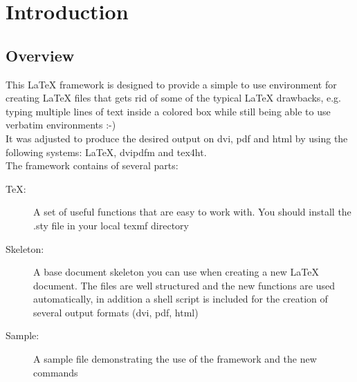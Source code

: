 \section{Introduction}


\subsection{Overview}
This LaTeX framework is designed to provide a simple to use environment for creating LaTeX files
that gets rid of some of the typical LaTeX drawbacks, e.g. typing multiple lines of text inside
a colored box while still being able to use verbatim environments :-)\\
It was adjusted to produce the desired output on dvi, pdf and html by using the following
systems: LaTeX, dvipdfm and tex4ht.
\\

\noindent
The framework contains of several parts:
\begin{description}
\item[TeX:]
A set of useful functions that are easy to work with. You should install the .sty file
in your local texmf directory
\item[Skeleton:]
A base document skeleton you can use when creating a new LaTeX document. The files are
well structured and the new functions are used automatically, in addition a shell
script is included for the creation of several output formats (dvi, pdf, html)
\item[Sample:]
A sample file demonstrating the use of the framework and the new commands
\end{description}